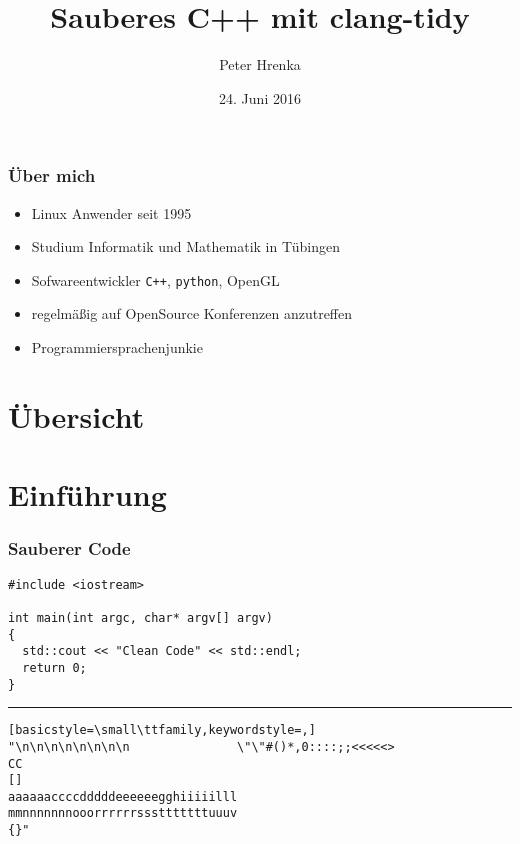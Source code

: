 \documentclass[aspectratio=169]{beamer}
\title{Sauberes C++ mit clang-tidy}
\institute{Linux Tag Tübingen 2017}
\author{Peter Hrenka}
\date{24. Juni 2016}
\begin{document}
\begin{frame}
\titlepage
\end{frame}
\begin{frame}
  \frametitle{Über mich}
  \begin{itemize}
    \item Linux Anwender seit 1995
    \item Studium Informatik und Mathematik in Tübingen
    \item Sofwareentwickler \texttt{C++}, \texttt{python}, OpenGL
    \item regelmäßig auf OpenSource Konferenzen anzutreffen
    \item Programmiersprachenjunkie
  \end{itemize}
\end{frame}
\section*{Übersicht}
\begin{frame}
  \tableofcontents
\end{frame}
\section{Einführung}
\begin{frame}[fragile]
  \frametitle{Sauberer Code}
  \begin{lstlisting}[basicstyle=\small\ttfamily,keywordstyle=\color{blue},]
#include <iostream>

int main(int argc, char* argv[] argv)
{
  std::cout << "Clean Code" << std::endl;
  return 0;
}
\end{lstlisting}
\pause
\hrule
\begin{lstlisting}[basicstyle=\small\ttfamily,keywordstyle=,]
"\n\n\n\n\n\n\n\n               \"\"#()*,0::::;;<<<<<>
CC
[]
aaaaaaccccdddddeeeeeegghiiiiilll
mmnnnnnnnooorrrrrrssstttttttuuuv
{}"
\end{lstlisting}
\end{frame}
\end{document}
